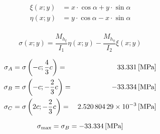 \begin{align*}
	\xi(x;y) &= x\cdot \cos\alpha + y\cdot \sin\alpha \\
	\eta(x;y) &= y\cdot \cos\alpha - x\cdot \sin\alpha \\
\end{align*}

\begin{equation*}
	\sigma(x;y) = \frac{M_{h_\xi}}{I_1}\eta(x;y) - \frac{M_{h_\eta}}{I_2}\xi(x;y)
\end{equation*}

\begin{align*}
	\sigma_A &= \sigma\left(-c;\frac{4}{3}c\right) = &\SI{33,331}{[\mega\pascal]} \\
	\sigma_B &= \sigma\left(-c;-\frac{2}{3}c\right) = &\SI{-33,334}{[\mega\pascal]} \\
	\sigma_C &= \sigma\left(2c;-\frac{2}{3}c\right) = &\SI{2.52080429e-3}{[\mega\pascal]}
\end{align*}

\begin{equation*}
	\sigma_\text{max} = \sigma_B = \SI{-33.334}{[\mega\pascal]}
\end{equation*}
